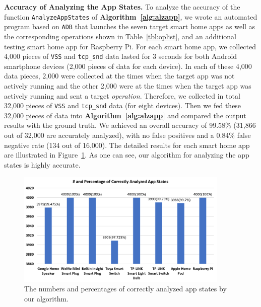 \documentclass[letterpaper,12pt]{article}
\begin{document}
\textbf{Accuracy of Analyzing the App States.} 
To analyze the accuracy of the function \texttt{AnalyzeAppStates} of {\bf Algorithm~\ref{alg:alzapp}}, we wrote an automated program based on \texttt{ADB} that launches the seven target smart home apps as well as the corresponding operations shown in Table~\ref{tbl:oplist}, and an additional testing smart home app for Raspberry Pi. For each smart home app, we collected 4,000 pieces of \texttt{VSS} and \texttt{tcp\_snd} data lasted for 3 seconds for both Android smartphone devices (2,000 pieces of data for each device). In each of these 4,000 data pieces, 2,000 were collected at the times when the target app was not actively running and the other 2,000 were at the times when the target app was actively running and sent a target \textit{operation}. Therefore, we collected in total 32,000 pieces of \texttt{VSS} and \texttt{tcp\_snd} data (for eight devices). Then we fed these 32,000 pieces of data into  {\bf Algorithm~\ref{alg:alzapp}} and compared the output results with the ground truth. We achieved an overall accuracy of 99.58\% (31,866 out of 32,000 are accurately analyzed), with no false positives and a 0.84\% false negative rate (134 out of 16,000). The detailed results for each smart home app are illustrated in Figure~\ref{fig:appstate}. As one can see, our algorithm for analyzing the app states is highly accurate.

\begin{figure}[!htb]
        \centering
        \includegraphics[width=0.9\textwidth]{appstate.png}
        \caption{The numbers and percentages of correctly analyzed app states by our algorithm.}
        \label{fig:appstate}
\end{figure}
\end{document}

